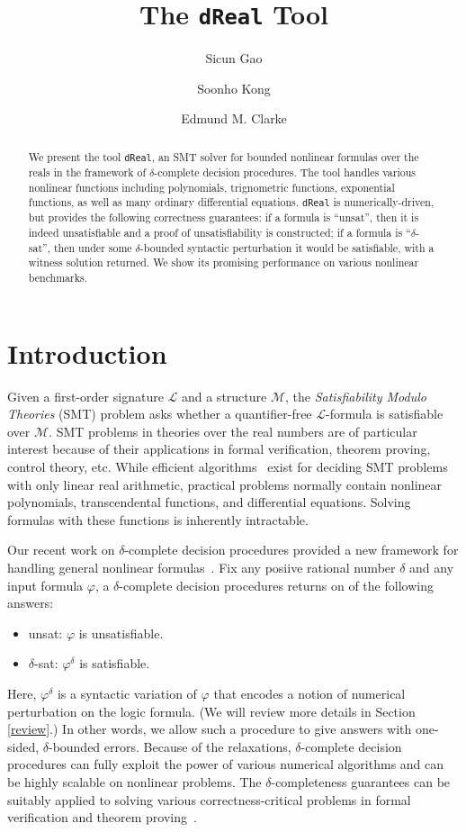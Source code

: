 \documentclass[envcountsect]{llncs}
\title{The {\tt dReal} Tool}
\author{Sicun Gao \and Soonho Kong \and Edmund M. Clarke}
\institute{Carnegie Mellon University, Pittsburgh, PA 15213}
\begin{document}
\maketitle

\begin{abstract}
We present the tool {\tt dReal}, an SMT solver for bounded
nonlinear formulas over the reals in the framework of $\delta$-complete decision
procedures. The tool handles various nonlinear functions including polynomials,
trignometric functions, exponential functions, as well as  many ordinary
differential equations. 
{\tt dReal} is numerically-driven, but provides the following correctness
guarantees: if a formula is ``unsat'', then it is indeed unsatisfiable and a proof
of unsatisfiability is constructed; if a
formula is ``$\delta$-sat'', then under some $\delta$-bounded syntactic perturbation it would
be satisfiable, with a witness solution returned. We show its promising
performance on various nonlinear benchmarks. 
\end{abstract}

\section{Introduction}

Given a first-order signature $\mathcal{L}$ and a 
structure $\mathcal{M}$, the {\em Satisfiability Modulo Theories} (SMT) problem
asks whether a quantifier-free $\mathcal{L}$-formula is satisfiable over
$\mathcal{M}$. SMT problems in theories over the real
numbers are of particular interest because of their applications in formal
verification, theorem proving, control theory, etc. While efficient
algorithms~\cite{linear06} exist for deciding SMT problems with only linear real
arithmetic, practical problems normally contain nonlinear polynomials,
transcendental functions, and differential equations. Solving formulas with
these functions is inherently intractable.

Our recent work on $\delta$-complete decision procedures
provided a new framework for handling general nonlinear formulas~\cite{}. Fix
any posiive rational number $\delta$ and any input formula $\varphi$, a
$\delta$-complete decision procedures returns on of the following answers:
\begin{itemize}
 \item {\sf unsat}: $\varphi$ is unsatisfiable.
 \item {\sf $\delta$-sat}: $\varphi^{\delta}$ is satisfiable.
\end{itemize}
Here, $\varphi^{\delta}$ is a syntactic variation of $\varphi$ that encodes a
notion of numerical perturbation on the logic formula. (We will review more
details in Section \ref{review}.) In other words, we allow such a procedure to
give answers with one-sided, $\delta$-bounded errors. Because of the
relaxations, $\delta$-complete decision procedures can fully exploit the
power of various numerical algorithms and can be highly scalable on
nonlinear problems. The $\delta$-completeness guarantees can be suitably
applied to solving various correctness-critical problems in formal verification
and theorem proving~\cite{}.
\end{document}
